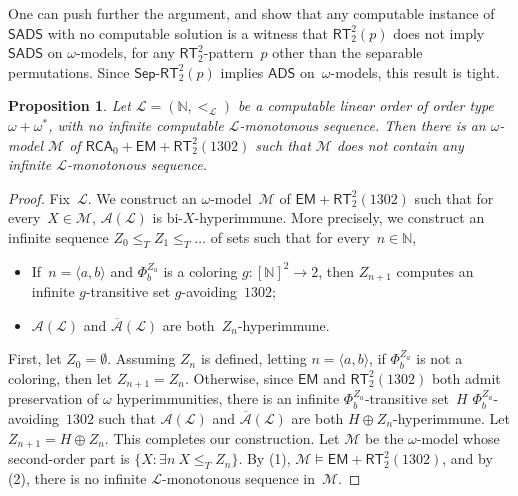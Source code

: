 \documentclass{article}
\newtheorem{theorem}{Theorem}
\numberwithin{theorem}{section}
\newtheorem{proposition}[theorem]{Proposition}
\newcommand{\ludovic}[1]{\textcolor{blue}{#1}}
\def\L{\mathcal{L}}
\def\A{\mathcal{A}}
\def\M{\mathcal{M}}
\newcommand{\RCA}[0]{\mathsf{RCA}}
\newcommand{\ADS}[0]{\mathsf{ADS}}
\newcommand{\EM}[0]{\mathsf{EM}}
\newcommand{\RT}[0]{\mathsf{RT}}
\newcommand{\SADS}{\mathsf{SADS}}
\newcommand{\coRT}[0]{\mathsf{coRT}}
\newcommand{\SepRT}[0]{\mathsf{Sep}\mbox{-}\mathsf{RT}}
\newcommand{\NN}[0]{\mathbb{N}}
\begin{document}
One can push further the argument, and show that any computable instance of~$\SADS$ with no computable solution is a witness that $\RT^2_2(p)$ does not imply $\SADS$ on $\omega$-models, for any $\RT^2_2$-pattern~$p$ other than the separable permutations. Since $\SepRT^2_2(p)$ implies $\ADS$ on~$\omega$-models, this result is tight.

\begin{proposition}
Let $\L = (\NN, <_\L)$ be a computable linear order of order type $\omega + \omega^*$, with no infinite computable $\L$-monotonous sequence. Then there is an $\omega$-model $\M$ of $\RCA_0 + \EM + \RT^2_2(1302)$ such that $\M$ does not contain any infinite $\L$-monotonous sequence.
\end{proposition}
\begin{proof}
Fix~$\L$. We construct an $\omega$-model~$\M$ of $\EM + \RT^2_2(1302)$ such that for every~$X \in \M$, $\A(\L)$ is bi-$X$-hyperimmune.  More precisely, we construct an infinite sequence $Z_0 \leq_T Z_1 \leq_T \dots$ of sets such that for every~$n \in \NN$,
\begin{itemize}
    \item[(1)] If~$n = \langle a, b\rangle$ and $\Phi^{Z_a}_b$ is a coloring $g : [\NN]^2 \to 2$, then $Z_{n+1}$ computes an infinite $g$-transitive set $g$-avoiding~$1302$;
    \item[(2)] $\A(\L)$ and $\overline{\A}(\L)$ are both~$Z_n$-hyperimmune.
\end{itemize}
First, let $Z_0 = \emptyset$. Assuming $Z_n$ is defined, letting $n = \langle a, b \rangle$, if $\Phi^{Z_a}_b$ is not a coloring, then let $Z_{n+1} = Z_n$. Otherwise, since $\EM$ and $\RT^2_2(1302)$ both admit preservation of $\omega$ hyperimmunities, there is an infinite $\Phi^{Z_a}_b$-transitive set~$H$ $\Phi^{Z_a}_b$-avoiding~$1302$ such that $\A(\L)$ and $\overline{\A}(\L)$ are both $H \oplus Z_n$-hyperimmune. Let $Z_{n+1} = H \oplus Z_n$. This completes our construction.
Let $\M$ be the $\omega$-model whose second-order part is $\{ X : \exists n\ X \leq_T Z_n \}$. By (1), $\M \models \EM + \RT^2_2(1302)$, and by (2), there is no infinite $\L$-monotonous sequence in~$\M$. 
\end{proof}

\end{document}
